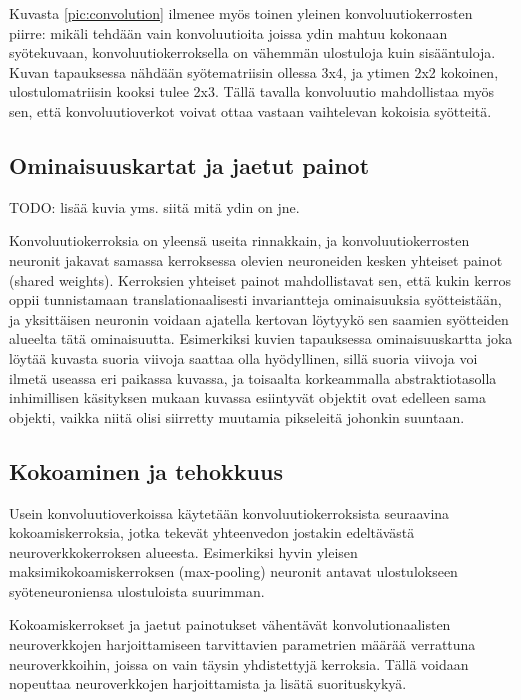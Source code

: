\documentclass[finnish]{tktltiki2}
\theoremstyle{definition}
\theoremstyle{remark}
\begin{document}
    Kuvasta \ref{pic:convolution} ilmenee myös toinen yleinen konvoluutiokerrosten piirre: mikäli tehdään vain konvoluutioita joissa ydin mahtuu kokonaan syötekuvaan, konvoluutiokerroksella on vähemmän ulostuloja kuin sisääntuloja. Kuvan tapauksessa nähdään syötematriisin ollessa 3x4, ja ytimen 2x2 kokoinen, ulostulomatriisin kooksi tulee 2x3. Tällä tavalla konvoluutio mahdollistaa myös sen, että konvoluutioverkot voivat ottaa vastaan vaihtelevan kokoisia syötteitä.

    \subsection{Ominaisuuskartat ja jaetut painot}
  TODO: lisää kuvia yms. siitä mitä ydin on jne.

    Konvoluutiokerroksia on yleensä useita rinnakkain, ja konvoluutiokerrosten neuronit jakavat samassa kerroksessa olevien neuroneiden kesken yhteiset painot (shared weights). Kerroksien yhteiset painot mahdollistavat sen, että kukin kerros oppii tunnistamaan translationaalisesti invariantteja ominaisuuksia syötteistään, ja yksittäisen neuronin voidaan ajatella kertovan löytyykö sen saamien syötteiden alueelta tätä ominaisuutta. Esimerkiksi kuvien tapauksessa ominaisuuskartta joka löytää kuvasta suoria viivoja saattaa olla hyödyllinen, sillä suoria viivoja voi ilmetä useassa eri paikassa kuvassa, ja toisaalta korkeammalla abstraktiotasolla inhimillisen käsityksen mukaan kuvassa esiintyvät objektit ovat edelleen sama objekti, vaikka niitä olisi siirretty muutamia pikseleitä johonkin suuntaan.

    \subsection{Kokoaminen ja tehokkuus}
    Usein konvoluutioverkoissa käytetään konvoluutiokerroksista seuraavina kokoamiskerroksia, jotka tekevät yhteenvedon jostakin edeltävästä neuroverkkokerroksen alueesta. Esimerkiksi hyvin yleisen maksimikokoamiskerroksen (max-pooling) neuronit antavat ulostulokseen syöteneuroniensa ulostuloista suurimman.

    Kokoamiskerrokset ja jaetut painotukset vähentävät konvolutionaalisten neuroverkkojen harjoittamiseen tarvittavien parametrien määrää verrattuna neuroverkkoihin, joissa on vain täysin yhdistettyjä kerroksia. Tällä voidaan nopeuttaa neuroverkkojen harjoittamista ja lisätä suorituskykyä.
\end{document}

